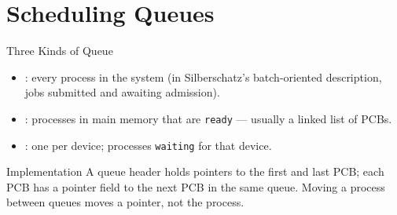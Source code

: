 \documentclass[aspectratio=169]{beamer}
\begin{document}
\section{Scheduling Queues}

\begin{frame}{Three Kinds of Queue}
  \begin{itemize}
    \item {}: every process in the system (in Silberschatz's
      batch-oriented description, jobs submitted and awaiting admission).
    \item {}: processes in main memory that are
      \texttt{ready} --- usually a linked list of PCBs.
    \item {}: one per device; processes \texttt{waiting} for
      that device.
  \end{itemize}
  \vspace{0.2cm}
  \begin{block}{Implementation}
    A queue header holds pointers to the first and last PCB; each PCB has a
    pointer field to the next PCB in the same queue. Moving a process between
    queues moves a pointer, not the process.
  \end{block}
\end{frame}
\end{document}
